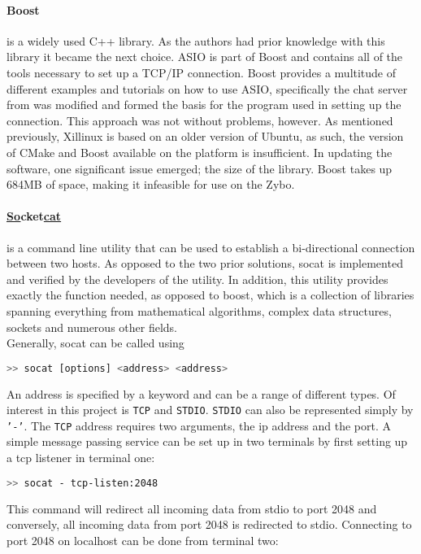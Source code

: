 \paragraph*{Boost}is a widely used C++ library.
As the authors had prior knowledge with this library it became the next choice.
ASIO is part of Boost and contains all of the tools necessary to set up a TCP/IP connection.
Boost provides a multitude of different examples and tutorials on how to use ASIO, specifically the chat server from \cite{boostchat} was modified and formed the basis for the program used in setting up the connection.
This approach was not without problems, however.
As mentioned previously, Xillinux is based on an older version of Ubuntu, as such, the version of CMake and Boost available on the platform is insufficient.
In updating the software, one significant issue emerged; the size of the library.
Boost takes up 684MB of space, making it infeasible for use on the Zybo.

\paragraph*{\underline{So}cket\underline{cat}} is a command line utility that can be used to establish a bi-directional connection between two hosts.
As opposed to the two prior solutions, socat is implemented and verified by the developers of the utility.
In addition, this utility provides exactly the function needed, as opposed to boost, which is a collection of libraries spanning everything from mathematical algorithms, complex data structures, sockets and numerous other fields.\\
Generally, socat can be called using
\begin{lstlisting}[language=bash]
>> socat [options] <address> <address>
\end{lstlisting}
An address is specified by a keyword and can be a range of different types.
Of interest in this project is \texttt{TCP} and \texttt{STDIO}.
\texttt{STDIO} can also be represented simply by \texttt{'-'}.
The \texttt{TCP} address requires two arguments, the ip address and the port.
A simple message passing service can be set up in two terminals by first setting up a tcp listener in terminal one:

\begin{lstlisting}[language=bash]
>> socat - tcp-listen:2048
\end{lstlisting}

This command will redirect all incoming data from stdio to port 2048 and conversely, all incoming data from port 2048 is redirected to stdio. 
Connecting to port 2048 on localhost can be done from terminal two:


